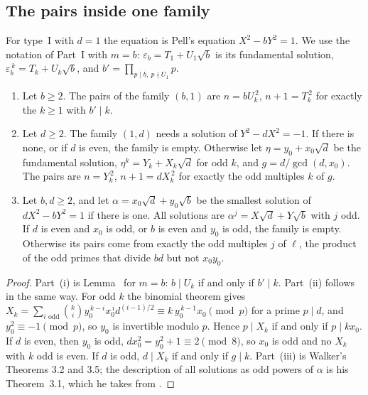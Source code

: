 \subsection{The pairs inside one family}

For type~I with $d = 1$ the equation is Pell's equation $X^2 - bY^2 = 1$. We use the notation of Part~I with $m = b$: $\varepsilon_b =
T_1 + U_1\sqrt{b}$ is its fundamental solution, $\varepsilon_b^{\,k} = T_k + U_k\sqrt{b}$, and $b' = \prod_{p \mid b,\ p \nmid U_1} p$.

\begin{proposition}
\begin{enumerate}
\item[(i)] Let $b \ge 2$. The pairs of the family $(b, 1)$ are $n = bU_k^{\,2}$, $n + 1 = T_k^{\,2}$ for exactly the $k \ge 1$ with
  $b' \mid k$.
\item[(ii)] Let $d \ge 2$. The family $(1, d)$ needs a solution of $Y^2 - dX^2 = -1$. If there is none, or if $d$ is even, the family is
  empty. Otherwise let $\eta = y_0 + x_0\sqrt{d}$ be the fundamental solution, $\eta^k = Y_k + X_k\sqrt{d}$ for odd $k$, and
  $g = d/\gcd(d, x_0)$. The pairs are $n = Y_k^{\,2}$, $n + 1 = dX_k^{\,2}$ for exactly the odd multiples $k$ of $g$.
\item[(iii)] Let $b, d \ge 2$, and let $\alpha = x_0\sqrt{d} + y_0\sqrt{b}$ be the smallest solution of $dX^2 - bY^2 = 1$ if there is one.
  All solutions are $\alpha^{j} = X\sqrt{d} + Y\sqrt{b}$ with $j$ odd. If $d$ is even and $x_0$ is odd, or $b$ is even and $y_0$ is odd,
  the family is empty. Otherwise its pairs come from exactly the odd multiples $j$ of $\ell$, the product of the odd primes that divide
  $bd$ but not $x_0 y_0$.
\end{enumerate}
\end{proposition}

\begin{proof}
Part~(i) is Lemma~ for $m = b$: $b \mid U_k$ if and only if $b' \mid k$. Part~(ii) follows in the same way. For odd $k$
the binomial theorem gives $X_k = \sum_{i \text{ odd}} \binom{k}{i} y_0^{\,k-i} x_0^{\,i} d^{(i-1)/2} \equiv k\, y_0^{\,k-1} x_0 \pmod p$ for a
prime $p \mid d$, and $y_0^2 \equiv -1 \pmod p$, so $y_0$ is invertible modulo $p$. Hence $p \mid X_k$ if and only if $p \mid k x_0$. If $d$ is
even, then $y_0$ is odd, $dx_0^2 = y_0^2 + 1 \equiv 2 \pmod 8$, so $x_0$ is odd and no $X_k$ with $k$ odd is even. If $d$ is odd, $d \mid X_k$
if and only if $g \mid k$. Part~(iii) is Walker's Theorems 3.2 and 3.5; the description of all solutions as odd powers of $\alpha$ is his
Theorem~3.1, which he takes from \cite[Theorem~9]{Walker1967}.
\end{proof}

